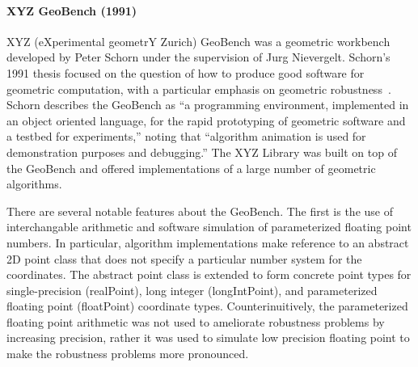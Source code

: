 \paragraph{XYZ GeoBench (1991)}

XYZ (eXperimental geometrY Zurich) GeoBench was a geometric workbench developed
by Peter Schorn under the supervision of Jurg Nievergelt. Schorn's 1991 thesis
focused on the question of how to produce good software for geometric
computation, with a particular emphasis on geometric
robustness~\cite{schorn1991robust}. Schorn describes the
GeoBench as ``a programming environment, implemented in an object oriented
language, for the rapid prototyping of geometric software and a testbed for
experiments,'' noting that ``algorithm animation is used for demonstration
purposes and debugging.'' The XYZ Library was built on top of the GeoBench and
offered implementations of a large number of geometric algorithms. 

There are several notable features about the GeoBench. The first is the use of
interchangable arithmetic and software simulation of parameterized floating
point numbers. In particular, algorithm implementations make reference to an
abstract 2D point class that does not specify a particular number system for the
coordinates. The abstract point class is extended to form concrete point types
for single-precision (realPoint), long integer (longIntPoint), and parameterized
floating point (floatPoint) coordinate types. Counterinuitively, the
parameterized floating point arithmetic was not used to ameliorate robustness
problems by increasing precision, rather it was used to simulate low precision
floating point to make the robustness problems more pronounced.


